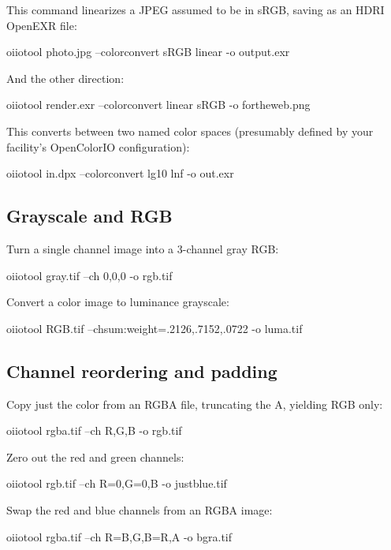 This command linearizes a JPEG assumed to be in sRGB, saving as
an HDRI OpenEXR file:

\begin{code}
    oiiotool photo.jpg --colorconvert sRGB linear -o output.exr
\end{code}

\noindent And the other direction:

\begin{code}
    oiiotool render.exr --colorconvert linear sRGB -o fortheweb.png
\end{code}

\noindent This converts between two named color spaces (presumably
defined by your facility's OpenColorIO configuration):

\begin{code}
    oiiotool in.dpx --colorconvert lg10 lnf -o out.exr
\end{code}


\subsection*{Grayscale and RGB}

\noindent Turn a single channel image into a 3-channel gray RGB:
\begin{code}
    oiiotool gray.tif --ch 0,0,0 -o rgb.tif
\end{code}

\noindent Convert a color image to luminance grayscale:

\begin{code}
    oiiotool RGB.tif --chsum:weight=.2126,.7152,.0722 -o luma.tif
\end{code}

\subsection*{Channel reordering and padding}

\noindent Copy just the color from an RGBA file, truncating the A,
yielding RGB only:
\begin{code}
    oiiotool rgba.tif --ch R,G,B -o rgb.tif
\end{code}

\noindent Zero out the red and green channels:
\begin{code}
    oiiotool rgb.tif --ch R=0,G=0,B -o justblue.tif
\end{code}

\noindent Swap the red and blue channels from an RGBA image:
\begin{code}
    oiiotool rgba.tif --ch R=B,G,B=R,A -o bgra.tif
\end{code}

